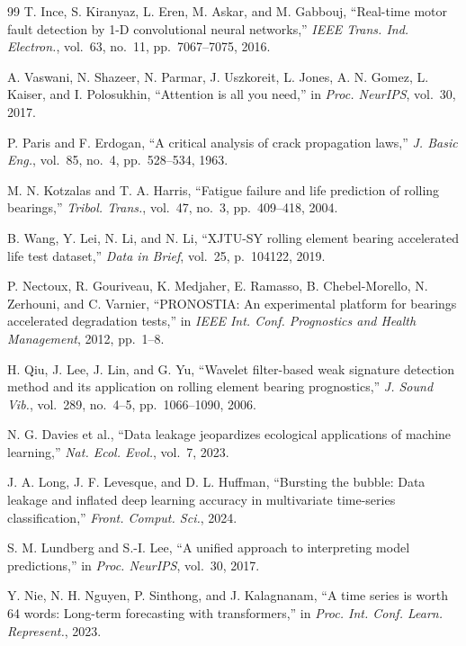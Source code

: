 \documentclass[5p,twocolumn]{elsarticle}
\begin{document}
\begin{thebibliography}{99}
T. Ince, S. Kiranyaz, L. Eren, M. Askar, and M. Gabbouj,
``Real-time motor fault detection by 1-D convolutional neural networks,''
\textit{IEEE Trans. Ind. Electron.}, vol.~63, no.~11, pp.~7067--7075, 2016.

A. Vaswani, N. Shazeer, N. Parmar, J. Uszkoreit, L. Jones, A. N. Gomez, L. Kaiser, and I. Polosukhin,
``Attention is all you need,''
in \textit{Proc. NeurIPS}, vol.~30, 2017.

P. Paris and F. Erdogan,
``A critical analysis of crack propagation laws,''
\textit{J. Basic Eng.}, vol.~85, no.~4, pp.~528--534, 1963.

M. N. Kotzalas and T. A. Harris,
``Fatigue failure and life prediction of rolling bearings,''
\textit{Tribol. Trans.}, vol.~47, no.~3, pp.~409--418, 2004.

B. Wang, Y. Lei, N. Li, and N. Li,
``XJTU-SY rolling element bearing accelerated life test dataset,''
\textit{Data in Brief}, vol.~25, p.~104122, 2019.

P. Nectoux, R. Gouriveau, K. Medjaher, E. Ramasso, B. Chebel-Morello, N. Zerhouni, and C. Varnier,
``PRONOSTIA: An experimental platform for bearings accelerated degradation tests,''
in \textit{IEEE Int. Conf. Prognostics and Health Management}, 2012, pp.~1--8.

H. Qiu, J. Lee, J. Lin, and G. Yu,
``Wavelet filter-based weak signature detection method and its application on rolling element bearing prognostics,''
\textit{J. Sound Vib.}, vol.~289, no.~4--5, pp.~1066--1090, 2006.

N. G. Davies et al.,
``Data leakage jeopardizes ecological applications of machine learning,''
\textit{Nat. Ecol. Evol.}, vol.~7, 2023.

J. A. Long, J. F. Levesque, and D. L. Huffman,
``Bursting the bubble: Data leakage and inflated deep learning accuracy in multivariate time-series classification,''
\textit{Front. Comput. Sci.}, 2024.

S. M. Lundberg and S.-I. Lee,
``A unified approach to interpreting model predictions,''
in \textit{Proc. NeurIPS}, vol.~30, 2017.

Y. Nie, N. H. Nguyen, P. Sinthong, and J. Kalagnanam,
``A time series is worth 64 words: Long-term forecasting with transformers,''
in \textit{Proc. Int. Conf. Learn. Represent.}, 2023.

\end{thebibliography}
\end{document}
